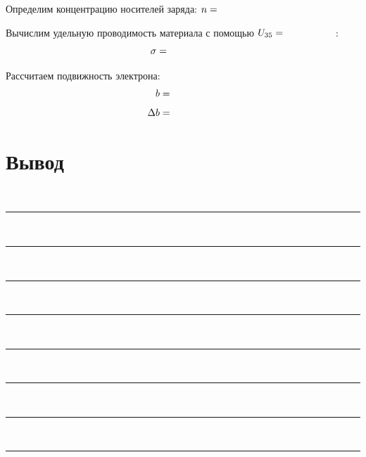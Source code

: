 \documentclass{physlab}
\begin{document}
Определим концентрацию носителей заряда: $n = \val$
	
Вычислим удельную проводимость материала с помощью $U_{35}=\val$ : $$\sigma=\val$$

Рассчитаем подвижность электрона:
\begin{align*}
b &= \val \\[1ex]
\Delta b &=\val
\end{align*}


\section{Вывод}

~\\[-1ex]\hrule~\\[1ex]\hrule~\\[1ex]\hrule~\\[1ex]\hrule~\\[1ex]\hrule~\\[1ex]\hrule~\\[1ex]\hrule~\\[1ex]\hrule
\end{document}
